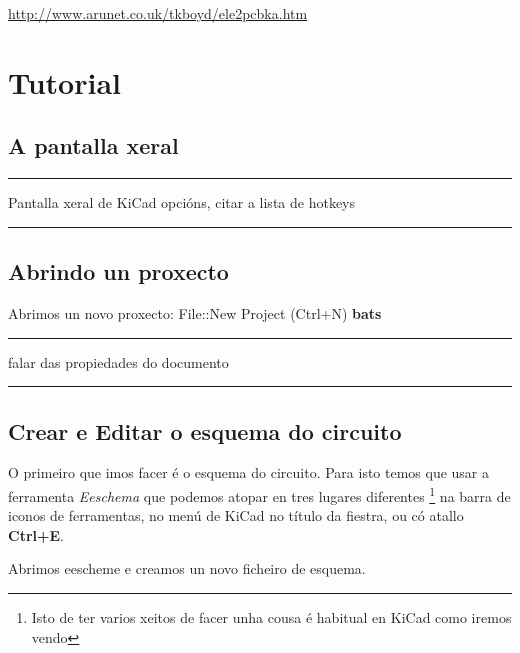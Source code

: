 \url{http://www.arunet.co.uk/tkboyd/ele2pcbka.htm}

\section{Tutorial}\label{tutorial}

\subsection{A pantalla xeral}\label{a-pantalla-xeral}

\begin{center}\rule{0.5\linewidth}{\linethickness}\end{center}

Pantalla xeral de KiCad opcións, citar a lista de hotkeys

\begin{center}\rule{0.5\linewidth}{\linethickness}\end{center}

\subsection{Abrindo un proxecto}\label{abrindo-un-proxecto}

Abrimos un novo proxecto: File::New Project (Ctrl+N) \textbf{bats}

\begin{center}\rule{0.5\linewidth}{\linethickness}\end{center}

falar das propiedades do documento

\begin{center}\rule{0.5\linewidth}{\linethickness}\end{center}

\subsection{Crear e Editar o esquema do
circuito}\label{crear-e-editar-o-esquema-do-circuito}

O primeiro que imos facer é o esquema do circuito. Para isto temos que
usar a ferramenta \emph{Eeschema} que podemos atopar en tres lugares
diferentes \footnote{Isto de ter varios xeitos de facer unha cousa é
  habitual en KiCad como iremos vendo} na barra de iconos de
ferramentas, no menú de KiCad no título da fiestra, ou có atallo
\textbf{Ctrl+E}.

Abrimos eescheme e creamos un novo ficheiro de esquema.

